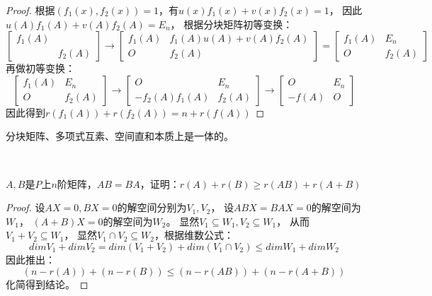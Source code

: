\begin{proof}
  根据$(f_1(x),f_2(x)) = 1$，有$u(x)f_1(x) + v(x) f_2(x) = 1$，
  因此$u(A)f_1(A) + v(A)f_2(A) = E_n$，
  根据分块矩阵初等变换：
  \begin{equation*}
    \left[
      \begin{array}{cc}
        f_1(A)&\\
        &f_2(A)
      \end{array}
    \right] \rightarrow \left[
      \begin{array}{cc}
        f_1(A)&f_1(A)u(A) + v(A)f_2(A)\\
        O&f_2(A)
      \end{array}
    \right] = \left[
      \begin{array}{cc}
        f_1(A)&E_n\\
        O&f_2(A)
      \end{array}
    \right]
  \end{equation*}
  再做初等变换：
  \begin{equation*}
    \left[
      \begin{array}{cc}
        f_1(A)&E_n\\
        O&f_2(A)
      \end{array}
    \right]
    \rightarrow \left[
      \begin{array}{cc}
        O&E_n\\
        -f_2(A)f_1(A)& f_2(A)
      \end{array}
    \right] \rightarrow \left[
      \begin{array}{cc}
        O&E_n\\
        -f(A)&O
      \end{array}
    \right]
  \end{equation*}
  因此得到$r(f_1(A)) + r(f_2(A)) = n + r(f(A))$
\end{proof}

\begin{note}
  分块矩阵、多项式互素、空间直和本质上是一体的。
\end{note}

~

\begin{exercise}[从线性空间角度解决难题]
  $A,B$是$P$上$n$阶矩阵，$AB = BA$，证明：$r(A) + r(B) \geq r(AB) + r(A+B)$
\end{exercise}

\begin{proof}
  设$AX = 0, BX = 0$的解空间分别为$V_1,V_2$，
  设$ABX = BAX = 0$的解空间为$W_1$，
  $(A+B)X = 0$的解空间为$W_2$。
  显然$V_1 \subseteq W_1, V_2 \subseteq W_1$，
  从而$V_1 + V_2 \subseteq W_1$，
  显然$V_1 \cap V_2 \subseteq W_2$，根据维数公式：
  \begin{equation*}
    dim V_1 + dim V_2 = dim(V_1 + V_2) + dim(V_1 \cap V_2) \leq dim W_1 + dim W_2
  \end{equation*}
  因此推出：
  \begin{equation*}
    (n - r(A)) + (n - r(B)) \leq (n - r(AB)) + (n - r(A+B))
  \end{equation*}
  化简得到结论。
\end{proof}

